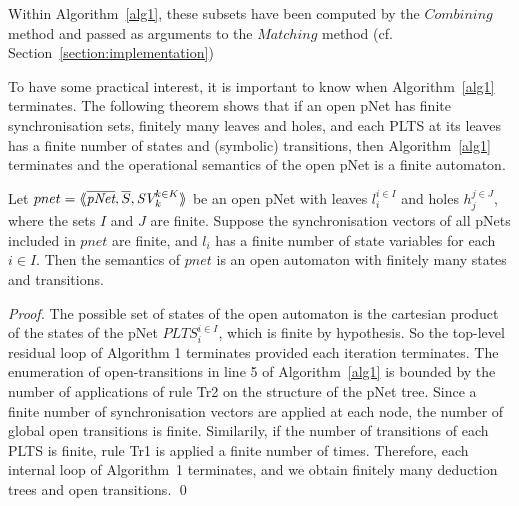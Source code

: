 \documentclass[smallcondensed]{svjour3}
\newcommand{\TODO}[1]{\textcolor{red}{\textbf{[TODO:#1]}}}
\newcommand{\Pred}{\symb{Pred}}
\begin{document}

Within Algorithm~\ref{alg1}, these subsets have been computed by the
$Combining$ method and passed as arguments to the $Matching$ method
(cf. Section~\ref{section:implementation}) 

To have some practical interest, it is important to know when Algorithm~\ref{alg1} terminates. The following theorem shows that if an open pNet
has finite synchronisation sets, finitely many leaves and
holes, and each PLTS at its leaves has a finite number of states and
(symbolic) transitions, then Algorithm~\ref{alg1} terminates and the operational semantics of the open pNet is a finite automaton. 

\medskip
\begin{theorem}[Finiteness]\cite{henrio:Forte2016}
	Let $pnet=\mylangle \overline{\pNet},\overline{S}, \symb{SV}_k^{k\in K}\myrangle$ be an open pNet  with leaves $l_i^{i\in I}$ and holes $h_j^{j\in
		J}$, where the sets $I$ and $J$ are finite. Suppose the synchronisation vectors of all pNets 
	included in  $pnet$   are finite, and 
	$l_i $ has a finite number of state variables for each $i\in I$. Then the semantics of $pnet$ is an open automaton 
	with finitely many states and transitions.
\end{theorem}
\begin{proof}
  The possible set of states of the open automaton is the cartesian
  product of the states of the pNet $PLTS_i^{i\in I}$, which is finite by
  hypothesis. So the top-level residual loop of Algorithm 1 terminates provided each 
  iteration terminates. The enumeration of open-transitions in line 5 of Algorithm~\ref{alg1} is bounded by the
  number of applications of rule Tr2 on the structure of the
  pNet tree. Since a finite number of synchronisation vectors are applied
  at each node, the number of global open transitions is finite. Similarily, if the number
  of transitions of each PLTS is finite, rule Tr1 is 
  applied a finite number of times. Therefore, each internal loop of Algorithm~1 terminates, and we obtain finitely many deduction trees and
  open transitions.
  \hfill \qed
  \end{proof}
\end{document}
